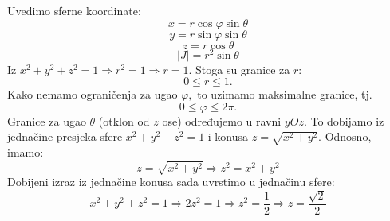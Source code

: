 \documentclass[a4paper,11pt]{article}
\begin{document}
\begin{center}
\end{center}
Uvedimo sferne koordinate:
$$x = r\cos{\varphi} \sin{\theta}$$
$$y = r\sin{\varphi} \sin{\theta}$$
$$z = r \cos{\theta}$$
$$|J| = r^{2}\sin{\theta}$$
Iz $x^2 + y^2 + z^2 = 1 \Rightarrow r^2 = 1\Rightarrow r = 1. $
Stoga su granice za $r$:
$$0\leq r\leq 1.$$
Kako nemamo ograničenja za ugao $\varphi,$ to uzimamo maksimalne granice, tj.
$$0\leq \varphi\leq 2\pi.$$
Granice za ugao $\theta$ (otklon od $z$ ose) određujemo u ravni $yOz$. To dobijamo iz jednačine presjeka sfere
$x^{2} + y^{2} + z^{2} = 1 $ i konusa $ z = \sqrt{x^{2} + y^{2}} . $
Odnosno, imamo:
$$z = \sqrt{x^{2} + y^{2}} \Rightarrow z^2 = x^{2} + y^{2}$$
Dobijeni izraz iz jednačine konusa sada uvrstimo u jednačinu sfere: 
$$x^{2} + y^{2} + z^{2} = 1 \Rightarrow 2z^2 = 1 \Rightarrow z^2 = \frac{1}{2} \Rightarrow z =   \frac{\sqrt{2}}{2} $$
\end{document}
